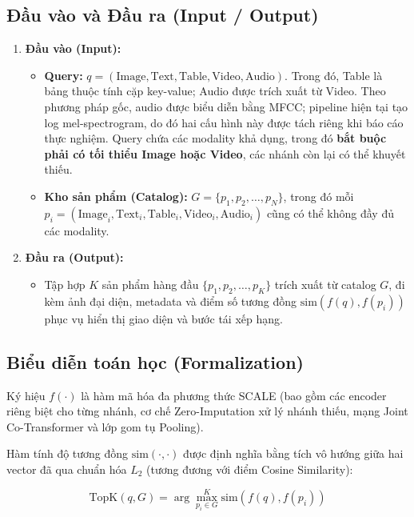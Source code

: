 \documentclass[10pt,conference]{IEEEtran}
\begin{document}
\subsection{Đầu vào và Đầu ra (Input / Output)}
\begin{enumerate}[leftmargin=*]
    \item \textbf{Đầu vào (Input):}
    \begin{itemize}
        \item \textbf{Query:} $q = (\text{Image}, \text{Text}, \text{Table}, \text{Video}, \text{Audio})$. 
        Trong đó, Table là bảng thuộc tính cặp key-value; Audio được trích xuất từ Video. Theo phương pháp gốc, audio được biểu diễn bằng MFCC; pipeline hiện tại tạo log mel-spectrogram, do đó hai cấu hình này được tách riêng khi báo cáo thực nghiệm. Query chứa các modality khả dụng, trong đó \textbf{bắt buộc phải có tối thiểu Image hoặc Video}, các nhánh còn lại có thể khuyết thiếu.
        \item \textbf{Kho sản phẩm (Catalog):} $G = \{p_1, p_2, \dots, p_N\}$, trong đó mỗi $p_i = (\text{Image}_i, \text{Text}_i, \text{Table}_i, \text{Video}_i, \text{Audio}_i)$ cũng có thể không đầy đủ các modality.
    \end{itemize}
    \item \textbf{Đầu ra (Output):}
    \begin{itemize}
        \item Tập hợp $K$ sản phẩm hàng đầu $\{p_1, p_2, \dots, p_K\}$ trích xuất từ catalog $G$, đi kèm ảnh đại diện, metadata và điểm số tương đồng $\text{sim}(f(q), f(p_i))$ phục vụ hiển thị giao diện và bước tái xếp hạng.
    \end{itemize}
\end{enumerate}

\subsection{Biểu diễn toán học (Formalization)}
Ký hiệu $f(\cdot)$ là hàm mã hóa đa phương thức SCALE (bao gồm các encoder riêng biệt cho từng nhánh, cơ chế Zero-Imputation xử lý nhánh thiếu, mạng Joint Co-Transformer và lớp gom tụ Pooling).

Hàm tính độ tương đồng $\text{sim}(\cdot, \cdot)$ được định nghĩa bằng tích vô hướng giữa hai vector đã qua chuẩn hóa $L_2$ (tương đương với điểm Cosine Similarity):

\begin{equation}
\text{TopK}(q, G) = \arg \max_{p_i \in G}^K \text{sim}(f(q), f(p_i))
\end{equation}
\end{document}
